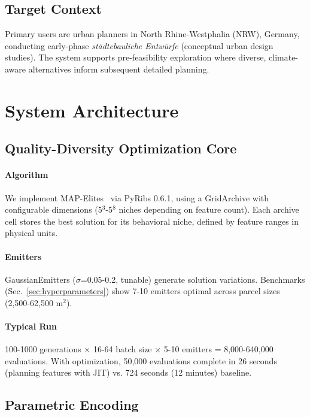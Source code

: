 \documentclass[times,final]{elsarticle}
\begin{document}
\subsection{Target Context}

Primary users are urban planners in North Rhine-Westphalia (NRW), Germany, conducting early-phase \textit{städtebauliche Entwürfe} (conceptual urban design studies). The system supports pre-feasibility exploration where diverse, climate-aware alternatives inform subsequent detailed planning.

\section{System Architecture}

\subsection{Quality-Diversity Optimization Core}

\paragraph{Algorithm}
We implement MAP-Elites~\cite{mouret2015illuminating} via PyRibs 0.6.1, using a GridArchive with configurable dimensions (5$^3$-5$^8$ niches depending on feature count). Each archive cell stores the best solution for its behavioral niche, defined by feature ranges in physical units.

\paragraph{Emitters}
GaussianEmitters ($\sigma$=0.05-0.2, tunable) generate solution variations. Benchmarks (Sec.~\ref{sec:hyperparameters}) show 7-10 emitters optimal across parcel sizes (2,500-62,500 m$^2$).

\paragraph{Typical Run}
100-1000 generations $\times$ 16-64 batch size $\times$ 5-10 emitters = 8,000-640,000 evaluations. With optimization, 50,000 evaluations complete in 26 seconds (planning features with JIT) vs. 724 seconds (12 minutes) baseline.

\subsection{Parametric Encoding}
\end{document}
